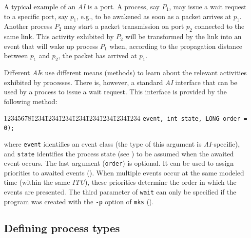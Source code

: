 A typical example of an {\em AI\/} is a port.
A process, say $P_1$, may issue a wait request to a specific port,
say $p_1$, e.g.,
to be awakened as soon as a packet arrives at $p_1$.
Another process $P_2$ may start a packet transmission on port $p_2$
connected to the same link.
This activity exhibited by $P_2$ will be transformed by the link into an
event that will wake up process $P_1$ when, according to the propagation
distance between $p_1$ and $p_2$, the packet has arrived at $p_1$.

Different {\em AI\/}s use different means (methods) to learn about the relevant
activities exhibited by processes.
There is, however, a standard {\em AI\/} interface that can be
used by a process to issue a wait request.
This interface is provided by the following method:
{\tt\begin{tabbing}
12345678\=1234\=1234\=1234\=1234\=1234\=1234\=1234\=1234\kill
{} {\tt event, int state, LONG order = 0);}
\end{tabbing}}
\noindent
where {\tt event} identifies an event class (the type of this argument is
{\em AI\/}-specific), and {\tt state} identifies the process state
(see ) to be assumed when the awaited event occurs.
The last argument ({\tt order}) is optional.
It can be used to assign priorities to awaited events ().
When multiple events occur at the same modeled time (within the same
{\em ITU\/}), these priorities determine the order in which the events
are presented.
The third parameter of {\tt wait} can only be specified if the
program was created with the {\tt -p} option of {\tt mks} ().

\subsection{Defining process types}
\label{rm_pr_dp}

